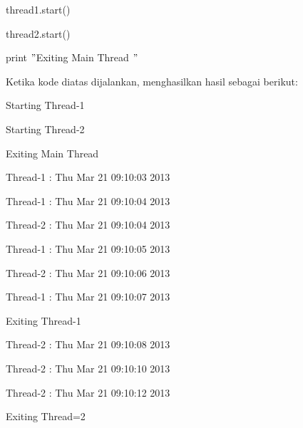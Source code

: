 \documentclass{wileySix}
\begin{document}
\noindent 
{\fontsize{9pt}{9pt}\selectfont thread1.start()} \par
\noindent 
{\fontsize{9pt}{9pt}\selectfont thread2.start()} \par
\noindent 
{\fontsize{9pt}{9pt}\selectfont print  $ " $Exiting Main Thread $ " $} \par
\vspace{12pt}
\begin{adjustwidth}
Ketika kode diatas dijalankan, menghasilkan hasil sebagai berikut:\end{adjustwidth}
\par
\noindent 
{\fontsize{10pt}{10pt}\selectfont Starting Thread-1} \par
\noindent 
{\fontsize{10pt}{10pt}\selectfont Starting Thread-2} \par
\noindent 
{\fontsize{10pt}{10pt}\selectfont Exiting Main Thread} \par
\noindent 
{\fontsize{10pt}{10pt}\selectfont Thread-1 : Thu Mar 21 09:10:03 2013} \par
\noindent 
{\fontsize{10pt}{10pt}\selectfont Thread-1 : Thu Mar 21 09:10:04 2013} \par
\noindent 
{\fontsize{10pt}{10pt}\selectfont Thread-2 : Thu Mar 21 09:10:04 2013} \par
\noindent 
{\fontsize{10pt}{10pt}\selectfont Thread-1 : Thu Mar 21 09:10:05 2013} \par
\noindent 
{\fontsize{10pt}{10pt}\selectfont Thread-2 : Thu Mar 21 09:10:06 2013} \par
\noindent 
{\fontsize{10pt}{10pt}\selectfont Thread-1 : Thu Mar 21 09:10:07 2013} \par
\noindent 
{\fontsize{10pt}{10pt}\selectfont Exiting Thread-1} \par
\noindent 
{\fontsize{10pt}{10pt}\selectfont Thread-2 : Thu Mar 21 09:10:08 2013} \par
\noindent 
{\fontsize{10pt}{10pt}\selectfont Thread-2 : Thu Mar 21 09:10:10 2013} \par
\noindent 
{\fontsize{10pt}{10pt}\selectfont Thread-2 : Thu Mar 21 09:10:12 2013} \par
\noindent 
{\fontsize{10pt}{10pt}\selectfont Exiting Thread=2} \par
\vspace{12pt}
\end{document}
